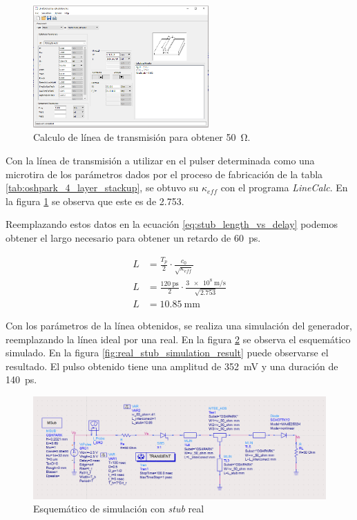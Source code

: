 \begin{figure}[tbp]
    \centering
    \includegraphics[width=0.6\textwidth]{images/tline_width_calculation.png}
    \caption{Calculo de línea de transmisión para obtener \qty{50}{\ohm}.}
    \label{fig:tline_width_calculation}
\end{figure}

Con la línea de transmisión a utilizar en el pulser determinada como una
microtira de los parámetros dados por el proceso de fabricación de la tabla
\ref{tab:oshpark_4_layer_stackup}, se obtuvo su $\kappa_{eff}$ con el programa
\textit{LineCalc}. En la figura \ref{fig:tline_width_calculation} se observa que
este es de \num{2.753}.

Reemplazando estos datos en la ecuación \ref{eq:stub_length_vs_delay} podemos
obtener el largo necesario para obtener un retardo de \qty{60}{\pico\second}.

\begin{equation}
    \begin{aligned}
        L &= \frac{T_p}{2} \cdot \frac{c_0}{\sqrt{\kappa_{eff}}} \\
        L &= \frac{\qty{120}{\pico\second}}{2} \cdot \frac{
            \qty{3e8}{\meter\per\second}}{\sqrt{2.753}} \\
        L &= \qty{10.85}{\milli\meter}
    \end{aligned}
\end{equation}

Con los parámetros de la línea obtenidos, se realiza una simulación del
generador, reemplazando la línea ideal por una real. En la figura
\ref{fig:real_stub_simulation_sch} se observa el esquemático simulado. En la
figura \ref{fig:real_stub_simulation_result} puede observarse el resultado. El
pulso obtenido tiene una amplitud de \qty{352}{\milli\volt} y una duración de
\qty{140}{\pico\second}.

\begin{figure}[tbp]
    \centering
    \includegraphics[width=\textwidth]{images/real_stub_simulation_sch.png}
    \caption{Esquemático de simulación con \textit{stub} real}
    \label{fig:real_stub_simulation_sch}
\end{figure}

